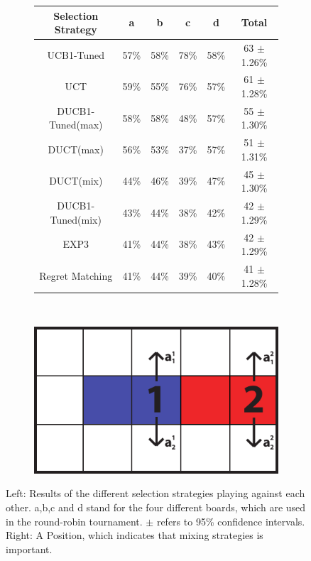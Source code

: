 \documentclass{article}
\begin{document}
\begin{figure}[h]
\centering
\begin{subfigure}[c]{0.5\textwidth}
\scriptsize
\centering
\begin{tabular}{|c||c|c|c|c|c|}
									\hline
	Selection Strategy	& a 		  & b 		  & c 		  & d 		  & Total 	\\ \hline
	UCB1-Tuned		      & 57\%	  & 58\%		& 78\%		& 58\%		& 63 $\pm$ 1.26\%		\\ \hline
	UCT			            & 59\%		& 55\%		& 76\%		& 57\%		& 61 $\pm$ 1.28\%		\\ \hline
	DUCB1-Tuned(max)	  & 58\%		& 58\%		& 48\%		& 57\%		& 55 $\pm$ 1.30\%		\\ \hline
	DUCT(max)		        & 56\%		& 53\%		& 37\%		& 57\%		& 51 $\pm$ 1.31\%		\\ \hline
	DUCT(mix)		        & 44\%		& 46\%		& 39\%		& 47\%		& 45 $\pm$ 1.30\%		\\ \hline
	DUCB1-Tuned(mix)	  & 43\%		& 44\%		& 38\%		& 42\%		& 42 $\pm$ 1.29\%		\\ \hline
	EXP3			          & 41\%		& 44\%		& 38\%		& 43\%		& 42 $\pm$ 1.29\%		\\ \hline
	Regret Matching		  & 41\%		& 44\%		& 39\%		& 40\%		& 41 $\pm$ 1.28\%		\\ \hline
\end{tabular}
\end{subfigure}
~~~~~~~
\begin{subfigure}[c]{0.3\textwidth}
\includegraphics[width=\textwidth]{images/stochastic.pdf}
\end{subfigure}
\caption{Left: Results of the different selection strategies playing against each other. a,b,c and d stand for the four different boards, which are used in the round-robin tournament. $\pm$ refers to 95\% confidence intervals. Right: A Position, which indicates that mixing strategies is important. }
\label{fig:example_avgs}
\end{figure}
\end{document}
